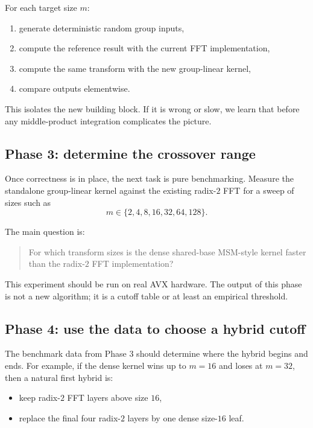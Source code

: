 \documentclass[11pt]{article}
\begin{document}
For each target size $m$:
\begin{enumerate}[itemsep=0.3em, topsep=0.4em]
  \item generate deterministic random group inputs,
  \item compute the reference result with the current FFT implementation,
  \item compute the same transform with the new group-linear kernel,
  \item compare outputs elementwise.
\end{enumerate}

This isolates the new building block.
If it is wrong or slow, we learn that before any middle-product integration
complicates the picture.

\subsection{Phase 3: determine the crossover range}

Once correctness is in place, the next task is pure benchmarking.
Measure the standalone group-linear kernel against the existing radix-$2$ FFT
for a sweep of sizes such as
\[
m \in \{2,4,8,16,32,64,128\}.
\]

The main question is:
\begin{quote}
For which transform sizes is the dense shared-base MSM-style kernel faster
than the radix-$2$ FFT implementation?
\end{quote}

This experiment should be run on real AVX hardware.
The output of this phase is not a new algorithm; it is a cutoff table or at
least an empirical threshold.

\subsection{Phase 4: use the data to choose a hybrid cutoff}

The benchmark data from Phase 3 should determine where the hybrid begins and
ends.
For example, if the dense kernel wins up to $m=16$ and loses at $m=32$, then a
natural first hybrid is:
\begin{itemize}[itemsep=0.3em, topsep=0.4em]
  \item keep radix-$2$ FFT layers above size $16$,
  \item replace the final four radix-$2$ layers by one dense size-$16$ leaf.
\end{itemize}
\end{document}
